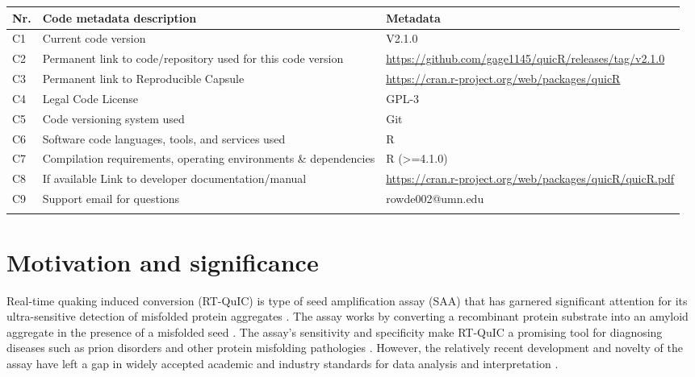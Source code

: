\documentclass[preprint,12pt,a4paper]{elsarticle}
\begin{document}
    \begin{table}[ht]
        \fontsize{9pt}{9pt}\selectfont
        \centering
        \begin{tabular}{lp{6cm}p{6cm}}
            \hline{}
            \textbf{Nr.} & \textbf{Code metadata description} & \textbf{Metadata} \\
            \hline{}
            C1 & Current code version & V2.1.0 \\
            C2 & Permanent link to code/repository used for this code version & \url{https://github.com/gage1145/quicR/releases/tag/v2.1.0} \\
            C3  & Permanent link to Reproducible Capsule & \url{https://cran.r-project.org/web/packages/quicR}\\
            C4 & Legal Code License & GPL-3\\
            C5 & Code versioning system used & Git\\
            C6 & Software code languages, tools, and services used & R\\
            C7 & Compilation requirements, operating environments \& dependencies & R (>=4.1.0)\\
            C8 & If available Link to developer documentation/manual & \url{https://cran.r-project.org/web/packages/quicR/quicR.pdf}\\
            C9 & Support email for questions & rowde002@umn.edu\\
            \hline{}
        \end{tabular}
    \end{table}

    \section{Motivation and significance}
        Real-time quaking induced conversion (RT-QuIC) is type of seed amplification assay (SAA) that has garnered significant attention for its ultra-sensitive detection of misfolded protein aggregates \cite{Wilham2010, Atarashi2011}. The assay works by converting a recombinant protein substrate into an amyloid aggregate in the presence of a misfolded seed \cite{Wilham2010, Orru2012, Orru2017, Orru2015, Bongianni2019, Dassanayake2016, Hwang2018, Groveman2018, Metrick2020}. The assay's sensitivity and specificity make RT-QuIC a promising tool for diagnosing diseases such as prion disorders and other protein misfolding pathologies \cite{Fiorini2020, Franceschini2017, Picasso-Risso2022, Holz2021}. However, the relatively recent development and novelty of the assay have left a gap in widely accepted academic and industry standards for data analysis and interpretation \cite{Rowden2023}.
\end{document}
